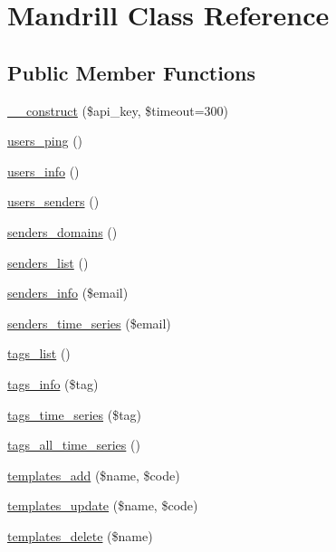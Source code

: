 \hypertarget{classMandrill}{
\section{Mandrill Class Reference}
\label{classMandrill}
}
\subsection*{Public Member Functions}
\begin{DoxyCompactItemize}
\item 
\hyperlink{classMandrill_a47e978ed08e12430e5d0f197fa71ad14}{\_\-\_\-construct} (\$api\_\-key, \$timeout=300)
\item 
\hyperlink{classMandrill_a589e70d0e68483c711ce6279e124bfc3}{users\_\-ping} ()
\item 
\hyperlink{classMandrill_aeafe039ea42e06ddf3218b8ae1dcf38b}{users\_\-info} ()
\item 
\hyperlink{classMandrill_a719dc7de06da90674792f38b03ff00f9}{users\_\-senders} ()
\item 
\hyperlink{classMandrill_ae0111c45de1b73c2d4023ba22093533e}{senders\_\-domains} ()
\item 
\hyperlink{classMandrill_a1a5194485cd5eb38dff8b78ed9f0b8a0}{senders\_\-list} ()
\item 
\hyperlink{classMandrill_a89e20ca0f9da8a3a32d46c59e4b2d49a}{senders\_\-info} (\$email)
\item 
\hyperlink{classMandrill_a06a09d53f06ab20095862543145f1587}{senders\_\-time\_\-series} (\$email)
\item 
\hyperlink{classMandrill_a10ffe6d8e7c50cdc2fdedc8071d39ddd}{tags\_\-list} ()
\item 
\hyperlink{classMandrill_a54d848f3ce34a1b0b12cbc78cfc2c2fa}{tags\_\-info} (\$tag)
\item 
\hyperlink{classMandrill_a541129f0740d60f5545db989367b14f0}{tags\_\-time\_\-series} (\$tag)
\item 
\hyperlink{classMandrill_a55ccf7721734dba3f5058206e0b6a4c9}{tags\_\-all\_\-time\_\-series} ()
\item 
\hyperlink{classMandrill_ab42ad92f550edc23e11fcdc79c8b8ab6}{templates\_\-add} (\$name, \$code)
\item 
\hyperlink{classMandrill_af70d4c7550167020579323e6162a1085}{templates\_\-update} (\$name, \$code)
\item 
\hyperlink{classMandrill_afcb53163cbbd1cf0b182e2f0ac7e993f}{templates\_\-delete} (\$name)
\item 

\end{DoxyCompactItemize}
